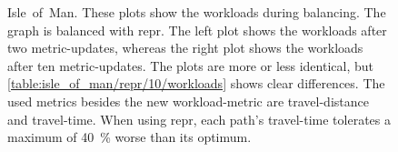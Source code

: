         \begin{figure}[hbp]
            \centering%
            \hfill%
            \caption[Comparison of two and ten metric-updates when balancing Isle~of~Man]{%
                Isle~of~Man.
                These plots show the workloads during \gls{balancing}.
                The graph is balanced with \gls{repr}.
                The left plot shows the workloads after two \gls{metric}-updates, whereas the right plot shows the workloads after ten \gls{metric}-updates.
                The plots are more or less identical, but \cref{table:isle_of_man/repr/10/workloads} shows clear differences.
                The used \glspl{metric} besides the new workload-\gls{metric} are travel-distance and travel-time.
                When using \gls{repr}, each path's travel-time tolerates a maximum of \si{\num{40} \percent} worse than its optimum.
            }
        \end{figure}


